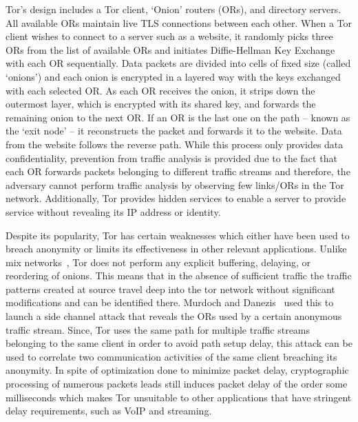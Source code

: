 \documentclass[conference]{IEEEtran}
\begin{document}
Tor's design includes a Tor client, `Onion' routers (ORs), and directory servers. All available ORs maintain live TLS connections between each other. When a Tor client wishes to connect to a server such as a website, it randomly picks three ORs from the list of available ORs and initiates Diffie-Hellman Key Exchange with each OR sequentially. Data packets are divided into cells of fixed size (called `onions') and each onion is encrypted in a layered way with the keys exchanged with each selected OR. As each OR receives the onion, it strips down the outermost layer, which is encrypted with its shared key, and forwards the remaining onion to the next OR. If an OR is the last one on the path -- known as the `exit node' -- it reconstructs the packet and forwards it to the website. Data from the website follows the reverse path. While this process only provides data confidentiality, prevention from traffic analysis is provided due to the fact that each OR forwards packets belonging to different traffic streams and therefore, the adversary cannot perform traffic analysis by observing few links/ORs in the Tor network. Additionally, Tor provides hidden services to enable a server to provide service without revealing its IP address or identity.

Despite its popularity, Tor has certain weaknesses which either have been used to breach anonymity or limits its effectiveness in other relevant applications. Unlike mix networks~\cite{Chaum:1981:UEM:358549.358563}, Tor does not perform any explicit buffering, delaying, or reordering of onions. This means that in the absence of sufficient traffic the traffic patterns created at source travel deep into the tor network without significant modifications and can be identified there. Murdoch and Danezis~\cite{Murdoch:2005:LTA:1058433.1059390} used this to launch a side channel attack that reveals the ORs used by a certain anonymous traffic stream. Since, Tor uses the same path for multiple traffic streams belonging to the same client in order to avoid path setup delay, this attack can be used to correlate two communication activities of the same client breaching its anonymity. In spite of optimization done to minimize packet delay, cryptographic processing of numerous packets leads still induces packet delay of the order some milliseconds which makes Tor unsuitable to other applications that have stringent  delay requirements, such as VoIP and streaming.
\end{document}
